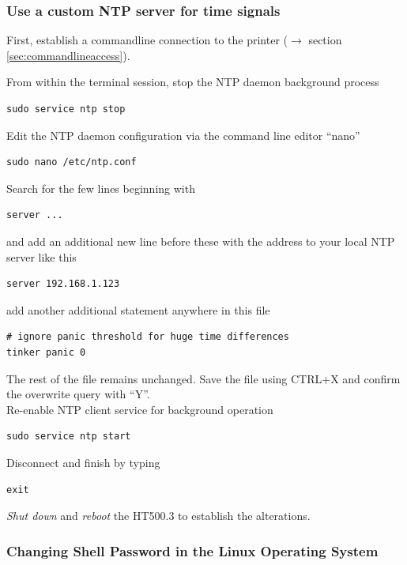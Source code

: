 \subsubsection{Use a custom NTP server for time signals}

First, establish a commandline connection to the printer ($\rightarrow$ section \ref{sec:commandlineaccess}).

From within the terminal session, stop the NTP daemon background process
\begin{verbatim}
sudo service ntp stop
\end{verbatim}
Edit the NTP daemon configuration via the command line editor “nano”
\begin{verbatim}
sudo nano /etc/ntp.conf
\end{verbatim}
Search for the few lines beginning with
\begin{verbatim}
server ...
\end{verbatim}
and add an additional new line before these with the address to your local NTP server like this
\begin{verbatim}
server 192.168.1.123
\end{verbatim}
add another additional statement anywhere in this file
\begin{verbatim}
# ignore panic threshold for huge time differences
tinker panic 0
\end{verbatim}
The rest of the file remains unchanged. Save the file using CTRL+X and confirm the overwrite query with “Y”.\\
Re-enable NTP client service for background operation
\begin{verbatim}
sudo service ntp start
\end{verbatim}
Disconnect and finish by typing
\begin{verbatim}
exit
\end{verbatim}
\emph{Shut down} and \emph{reboot} the HT500.3 to establish the alterations. 


\subsubsection{Changing Shell Password in the Linux Operating System}


